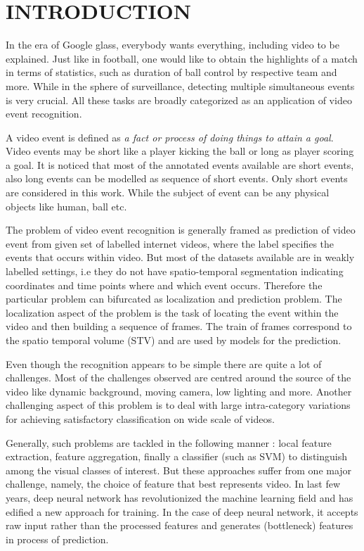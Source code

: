 \chapter{INTRODUCTION}
\label{chap:intro}
In the era of Google glass, %
everybody wants everything, including video to be explained.  Just like in football, one would like to obtain the highlights of a match in terms of statistics, such as duration of ball control by respective team and more.  While in the sphere of surveillance, detecting multiple simultaneous events is very crucial.  All these tasks are broadly categorized as an application of video event recognition. 

\par A video event is defined as \textit{a fact or process of doing things to attain a goal}.  Video events may be short like a player kicking the ball or long as player scoring a goal.  It is noticed that most of the annotated events available are short events, also long events can be modelled as sequence of short events.  Only short events are considered in this work.  While the subject of event can be any physical objects like human, ball etc.
\par The problem of video event recognition is generally framed as prediction of video event from given set of labelled internet videos, where the label specifies the events that occurs within video.  But most of the datasets available are in weakly labelled settings, i.e they do not have spatio-temporal segmentation indicating coordinates and time points where and which event occurs.  Therefore the particular problem can bifurcated as localization and prediction problem.  The localization aspect of the problem is the task of locating the event within the video %
and then building a sequence of frames.  The train of frames correspond to the spatio temporal volume (STV) and are used by models for the prediction.
\par Even though the recognition appears to be simple there are quite a lot of challenges.  Most of the challenges observed are centred around the source of the video like dynamic background, moving camera, low lighting and more.  Another challenging aspect of this problem is to deal with large intra-category variations for achieving satisfactory classification on wide scale of videos.
\par Generally, such problems are tackled in the following manner : local feature extraction, feature aggregation, finally a classifier (such as SVM) to distinguish among the visual classes of interest.  But these approaches suffer from one major challenge, namely, the choice of feature that best represents video.  In last few years, deep neural network has revolutionized the machine learning field and has edified a new approach for training.  In the case of deep neural network, it accepts raw input rather than the processed features and generates (bottleneck) features in process of prediction. 
